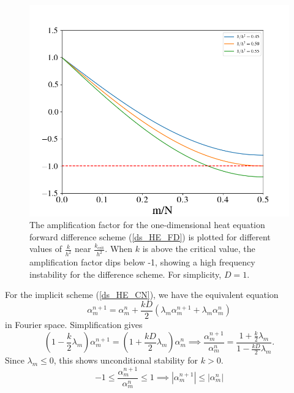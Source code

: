 \documentclass[12pt, reqno]{report}
\theoremstyle{definition}
\theoremstyle{remark}
\begin{document}
\begin{figure}[H]
    \centering

    \includegraphics[width = .5\paperwidth]{media_paper/amp_HE_FD.png}

    \caption{The amplification factor for the one-dimensional heat equation forward difference scheme (\ref{ds_HE_FD}) is plotted for different values of $\frac{k}{h^2}$ near $\frac{k_\text{crit}}{h^2}$. When $k$ is above the critical value, the amplification factor dips below -1, showing a high frequency instability for the difference scheme. For simplicity, $D=1$.}
    \label{fg_HE_amp}
\end{figure}

For the implicit scheme (\ref{ds_HE_CN}), we have the equivalent equation
\begin{equation} 
    \alpha_{m}^{n+1}=\alpha_{m}^{n}+ \frac{kD}{2}(\lambda_{m}\alpha_{m}^{n+1}+\lambda_{m}\alpha_{m}^{n})
\end{equation}
in Fourier space.
Simplification gives
\begin{equation} \label{ds_HE_CN_FT}
    (1- \frac{k}{2}\lambda_{m})\alpha_{m}^{n+1}=(1+ \frac{kD}{2}\lambda_{m})\alpha_{m}^{n}\implies \frac{\alpha_{m}^{n+1}}{\alpha_{m}^{n}}= \frac{1+\frac{k}{2}\lambda_{m}}{1- \frac{kD}{2}\lambda_{m}}.
\end{equation}
Since $\lambda_{m}\le0$, this shows unconditional stability for $k>0$.
\begin{equation}
    -1\le \frac{\alpha_{m}^{n+1}}{\alpha_{m}^{n}}\le1\implies |\alpha_{m}^{n+1}|\le|\alpha_{m}^{n}|
\end{equation}
\end{document}
